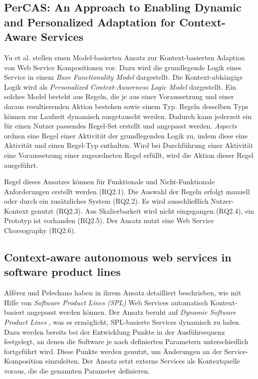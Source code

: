 \documentclass[conference,compsoc,ngerman]{IEEEtran}
\begin{document}
\subsection{PerCAS: An Approach to Enabling Dynamic and Personalized Adaptation for Context-Aware Services}
Yu et al. \cite{YHS12} stellen einen Model-basierten Ansatz zur Kontext-basierten Adaption von Web Service Kompositionen vor. Dazu wird die grundlegende Logik eines Service in einem \textit{Base Functionality Model} dargestellt. Die Kontext-abhängige Logik wird als \textit{Personalized Context-Awareness Logic Model} dargestellt. Ein solches Model besteht aus Regeln, die je aus einer Voraussetzung und einer daraus resultierenden Aktion bestehen sowie einem Typ. Regeln desselben Typs können zur Laufzeit dynamisch ausgetauscht werden. Dadurch kann jederzeit ein für einen Nutzer passendes Regel-Set erstellt und angepasst werden. \textit{Aspects} ordnen eine Regel einer Aktivität der grundlegenden Logik zu, indem diese eine Aktivität und einen Regel-Typ enthalten. Wird bei Durchführung einer Aktivität eine Voraussetzung einer zugeordneten Regel erfüllt, wird die Aktion dieser Regel ausgeführt.

Regel dieses Ansatzes können für Funktionale und Nicht-Funktionale Anforderungen erstellt werden (RQ2.1). Die Auswahl der Regeln erfolgt manuell oder durch ein zusätzliches System (RQ2.2). Es wird ausschließlich Nutzer-Kontext genutzt (RQ2.3). Aus Skalierbarkeit wird nicht eingegangen (RQ2.4), ein Prototyp ist vorhanden (RQ2.5). Der Ansatz nutzt eine Web Service Choreography (RQ2.6).

\subsection{Context-aware autonomous web services in software product lines}
Alférez und Pelechano \cite{AP11} haben in ihrem Ansatz detailliert beschrieben, wie mit Hilfe von \textit{Software Product Lines (SPL)} Web Services automatisch Kontext-basiert angepasst werden können. Der Ansatz beruht auf \textit{Dynamic Software Product Lines} \cite{HHP08}, was es ermöglicht, SPL-basierte Services dynamisch zu laden. Dazu werden bereits bei der Entwicklung Punkte in der Ausführsequenz festgelegt, an denen die Software je nach definierten Parametern unterschiedlich fortgeführt wird. Diese Punkte werden genutzt, um Änderungen an der Service-Komposition einzuleiten. Der Ansatz setzt externe Services als Kontextquelle voraus, die die genannten Parameter definieren.
\end{document}
